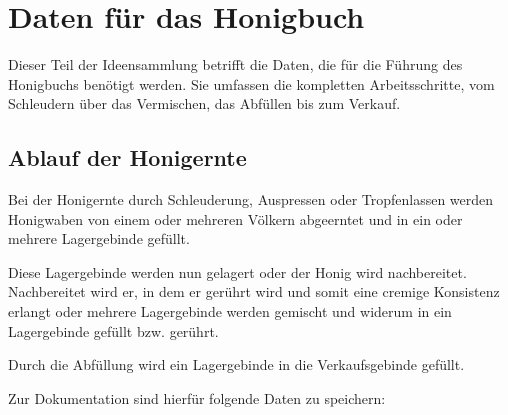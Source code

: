 \section{Daten für das Honigbuch}
Dieser Teil der Ideensammlung betrifft die Daten, die für die Führung des Honigbuchs benötigt werden. Sie umfassen die kompletten Arbeitsschritte, vom Schleudern über das Vermischen, das Abfüllen bis zum Verkauf. 

\subsection{Ablauf der Honigernte}
Bei der Honigernte durch Schleuderung, Auspressen oder Tropfenlassen werden Honigwaben von einem oder mehreren Völkern abgeerntet und in ein oder mehrere Lagergebinde gefüllt.

Diese Lagergebinde werden nun gelagert oder der Honig wird nachbereitet. Nachbereitet wird er, in dem er gerührt wird und somit eine cremige Konsistenz erlangt oder mehrere Lagergebinde werden gemischt und widerum in ein Lagergebinde gefüllt bzw. gerührt.
 
Durch die Abfüllung wird ein Lagergebinde in die Verkaufsgebinde gefüllt. \bigskip 

Zur Dokumentation sind hierfür folgende Daten zu speichern:
